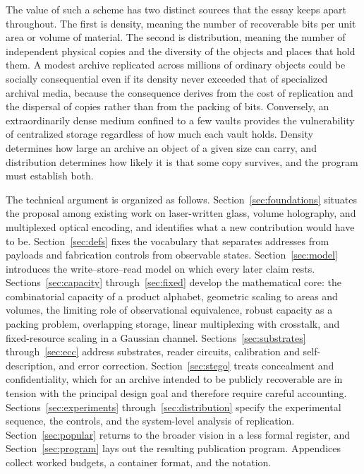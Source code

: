 The value of such a scheme has two distinct sources that the essay keeps apart throughout. The first is density, meaning the number of recoverable bits per unit area or volume of material. The second is distribution, meaning the number of independent physical copies and the diversity of the objects and places that hold them. A modest archive replicated across millions of ordinary objects could be socially consequential even if its density never exceeded that of specialized archival media, because the consequence derives from the cost of replication and the dispersal of copies rather than from the packing of bits. Conversely, an extraordinarily dense medium confined to a few vaults provides the vulnerability of centralized storage regardless of how much each vault holds. Density determines how large an archive an object of a given size can carry, and distribution determines how likely it is that some copy survives, and the program must establish both.

The technical argument is organized as follows. Section~\ref{sec:foundations} situates the proposal among existing work on laser-written glass, volume holography, and multiplexed optical encoding, and identifies what a new contribution would have to be. Section~\ref{sec:defs} fixes the vocabulary that separates addresses from payloads and fabrication controls from observable states. Section~\ref{sec:model} introduces the write--store--read model on which every later claim rests. Sections~\ref{sec:capacity} through~\ref{sec:fixed} develop the mathematical core: the combinatorial capacity of a product alphabet, geometric scaling to areas and volumes, the limiting role of observational equivalence, robust capacity as a packing problem, overlapping storage, linear multiplexing with crosstalk, and fixed-resource scaling in a Gaussian channel. Sections~\ref{sec:substrates} through~\ref{sec:ecc} address substrates, reader circuits, calibration and self-description, and error correction. Section~\ref{sec:stego} treats concealment and confidentiality, which for an archive intended to be publicly recoverable are in tension with the principal design goal and therefore require careful accounting. Sections~\ref{sec:experiments} through~\ref{sec:distribution} specify the experimental sequence, the controls, and the system-level analysis of replication. Section~\ref{sec:popular} returns to the broader vision in a less formal register, and Section~\ref{sec:program} lays out the resulting publication program. Appendices collect worked budgets, a container format, and the notation.


